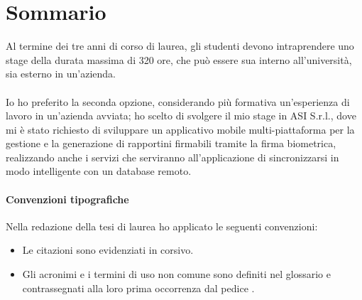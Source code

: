 \cleardoublepage
{}
{}
\begingroup
\let\clearpage\relax
\let\cleardoublepage\relax
\let\cleardoublepage\relax

\chapter*{Sommario}
Al termine dei tre anni di corso di laurea, gli studenti devono intraprendere uno stage della durata massima di 320 ore, che può essere sua interno all'università, sia esterno in un'azienda.
\\
\\
Io ho preferito la seconda opzione, considerando più formativa un'esperienza di lavoro in un'azienda avviata; ho scelto di svolgere il mio stage in ASI S.r.l., dove mi è stato richiesto di sviluppare un applicativo mobile multi-piattaforma per la gestione e la generazione di rapportini firmabili tramite la firma biometrica, realizzando anche i servizi che serviranno all'applicazione di sincronizzarsi in modo intelligente con un database remoto.

\subsubsection*{Convenzioni tipografiche}
Nella redazione della tesi di laurea ho applicato le seguenti convenzioni:
\begin{itemize}
	\item Le citazioni sono evidenziati in corsivo.
	\item Gli acronimi e i termini di uso non comune sono definiti nel glossario e contrassegnati alla loro prima occorrenza dal pedice . 
\end{itemize} 


%
%

\endgroup			

\vfill

